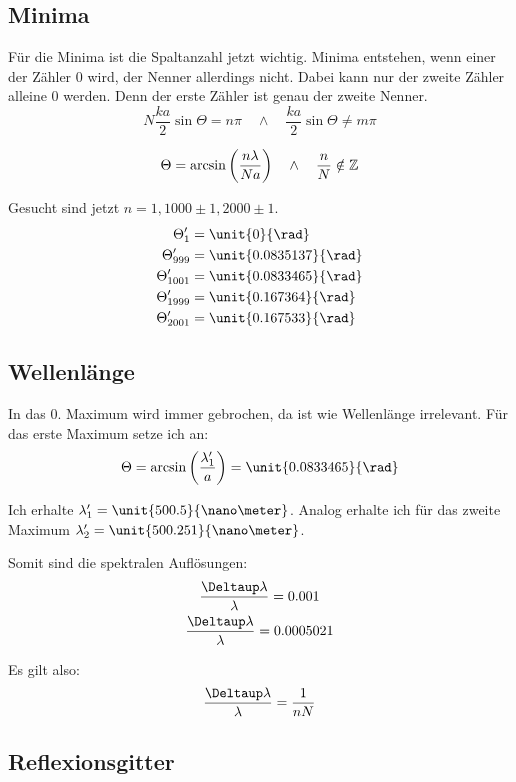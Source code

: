 \subsection{Minima}

Für die Minima ist die Spaltanzahl jetzt wichtig. Minima entstehen, wenn einer
der Zähler 0 wird, der Nenner allerdings nicht. Dabei kann nur der zweite
Zähler alleine 0 werden. Denn der erste Zähler ist genau der zweite Nenner.
\[
	N \frac{ka}2 \sin \Theta = n \pi
	\quad
	\wedge
	\quad
	\frac{ka}2 \sin \Theta \neq m \pi
\]

\[
	\Theta = \arcsin\del{\frac{n \lambda}{Na}}
	\quad
	\wedge
	\quad
	\frac nN \notin \mathbb Z
\]

Gesucht sind jetzt $n = 1, 1000 \pm 1, 2000 \pm 1$.
\begin{align*}
	\Theta_1' &= \unit{0}{\rad} \\
\Theta_{999}' &= \unit{0.0835137}{\rad} \\
\Theta_{1001}' &= \unit{0.0833465}{\rad} \\
\Theta_{1999}' &= \unit{0.167364}{\rad} \\
\Theta_{2001}' &= \unit{0.167533}{\rad} \\
\end{align*}

\subsection{Wellenlänge}

In das 0. Maximum wird immer gebrochen, da ist wie Wellenlänge irrelevant. Für das erste Maximum setze ich an:
\[
	\Theta = \arcsin\del{\frac{\lambda'_1}{a}} = \unit{0.0833465}{\rad}
\]

Ich erhalte $\lambda'_1 = \unit{500.5}{\nano\meter}$. Analog erhalte ich für das zweite Maximum $\lambda'_2 = \unit{500.251}{\nano\meter}$.

Somit sind die spektralen Auflösungen:
\begin{gather*}
	\frac{\Deltaup \lambda}{\lambda} = 0.001 \\
	\frac{\Deltaup \lambda}{\lambda} = 0.0005021
\end{gather*}

Es gilt also:
\[
	\frac{\Deltaup \lambda}{\lambda} = \frac{1}{n N}
\]

\subsection{Reflexionsgitter}


